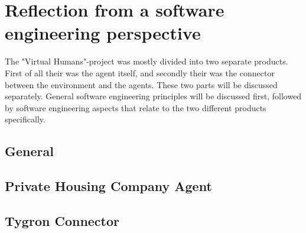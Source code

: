 \chapter{Reflection from a software engineering perspective}
\label{sec:Reflection from a software engineering perspective}

The "Virtual Humans"-project was mostly divided into two separate products.
First of all their was the agent itself, and secondly their was the connector between the environment and the agents.
These two parts will be discussed separately. General software engineering principles will be  discussed first,
followed by software engineering aspects that relate to the two different products specifically.

\section{General}
\label{sub:General}



\section{Private Housing Company Agent}
\label{sub:Private Housing Company Agent}


\section{Tygron Connector}
\label{sub:Tygron Connector}
